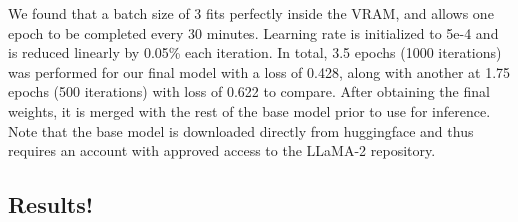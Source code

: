 \documentclass[]{article}
\begin{document}
We found that a batch size of 3 fits perfectly inside the VRAM, and allows one epoch to be completed every 30 minutes.
Learning rate is initialized to 5e-4 and is reduced linearly by 0.05\% each iteration. In total, 3.5 epochs (1000 iterations) was performed for our final model with a loss of 0.428, along with another at 1.75 epochs (500 iterations) with loss of 0.622 to compare. After obtaining the final weights, it is merged with the rest of the base model prior to use for inference. \\

Note that the base model is downloaded directly from huggingface and thus requires an account with approved access to the LLaMA-2 repository. \\

\newpage
\subsection{Results!}
\end{document}
